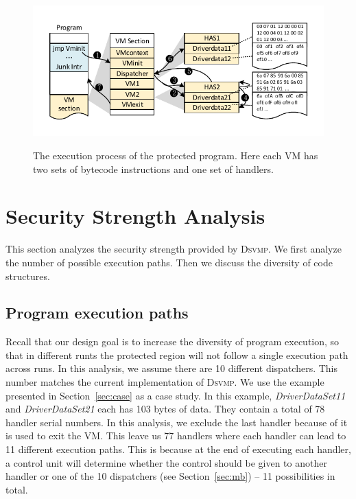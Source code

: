 \documentclass[preprint,12pt,3p]{elsarticle}
\newcommand{\DSVMP}{\textsc{Dsvmp}\xspace}
\begin{document}
\begin{figure}[!t]
  \centering
  \includegraphics[width=0.7\columnwidth]{figure/figex.pdf}\\
  \caption{The execution process of the protected program. Here each VM has two sets of bytecode instructions and one set of handlers.}\label{fig:Fig.ex}
\end{figure}

\section{Security Strength Analysis}\label{sec:s-eva}
This section analyzes the security strength provided by \DSVMP. We first analyze the number of possible execution paths. Then we discuss the diversity of code structures.


\subsection{Program execution paths}
Recall that our design goal is to increase the diversity of program execution,
so that in different runts the protected region will not follow a single execution path across runs.
In this analysis, we assume there are 10 different dispatchers. This number matches the current implementation of \DSVMP.
We use the example presented in Section~\ref{sec:case} as a case study.
In this example, \emph{DriverDataSet11} and \emph{DriverDataSet21} each has 103 bytes of data.
They contain a total of 78 handler serial numbers. In this analysis, we exclude the last handler because of it is used to exit the VM.
This leave us 77 handlers where each handler can lead to 11 different execution paths.
This is because at the end of executing each handler, a control unit will determine whether the control
should be given to another handler or one of the 10 dispatchers (see Section~\ref{sec:mb}) -- 11 possibilities in total.
\end{document}
